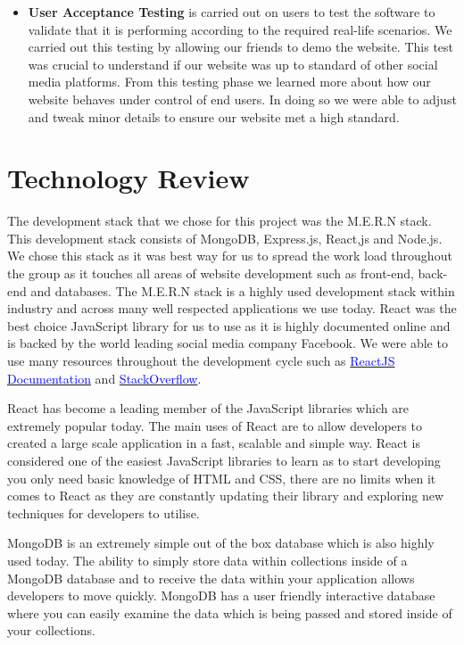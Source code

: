 \begin{itemize}
\item \textbf{User Acceptance Testing}
 is carried out on users to test the software to validate that it is performing according to the required real-life scenarios.\newline
 We carried out this testing by allowing our friends to demo the website. This test was crucial to understand if our website was up to standard of other social media platforms. From this testing phase we learned more about how our website behaves under control of end users. In doing so we were able to adjust and tweak minor details to ensure our website met a high standard.

\end{itemize}


\chapter{Technology Review}

The development stack that we chose for this project was the M.E.R.N stack. This development stack consists of MongoDB, Express.js, React,js and Node.js. We chose this stack as it was best way for us to spread the work load throughout the group as it touches all areas of website development such as front-end, back-end and databases. The M.E.R.N stack is a highly used development stack within industry and across many well respected applications we use today. React was the best choice JavaScript library for us to use as it is highly documented online and is backed by the world leading social media company Facebook. We were able to use many resources throughout the development cycle such as \href{https://reactjs.org/}{\textcolor{blue}{ReactJS Documentation}} and \href{https://stackoverflow.com/}{\textcolor{blue}{StackOverflow}}.
\newline

React has become a leading member of the JavaScript libraries which are extremely popular today. The main uses of React are to allow developers to created a large scale application in a fast, scalable and simple way. React is considered one of the easiest JavaScript libraries to learn as to start developing you only need basic knowledge of HTML and CSS, there are no limits when it comes to React as they are constantly updating their library and exploring new techniques for developers to utilise. 

\newline
MongoDB is an extremely simple out of the box database which is also highly used today. The ability to simply store data within collections inside of a MongoDB database and to receive the data within your application allows developers to move quickly. MongoDB has a user friendly interactive database where you can easily examine the data which is being passed and stored inside of your collections.

